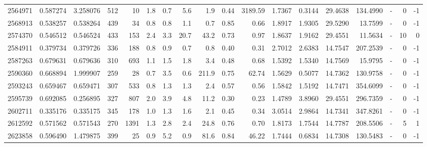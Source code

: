 \begin{tabular}{rrrrrrrrrrrrrrrlrr}
   2564971 & 0.587274 &   3.258076 &  512 &   10 &      1.8 &      0.7 &     5.6 &      1.9 &       0.44 &     3189.59 &  1.7367 &  0.3144 &   29.4638 &  134.4990 &             - &        0 &         -1 \\
   2568913 & 0.538257 &   0.538264 &  439 &   34 &      0.8 &      0.8 &     1.1 &      0.7 &       0.85 &        0.66 &  1.8917 &  1.9305 &   29.5290 &   13.7599 &             - &        0 &         -1 \\
   2574370 & 0.546512 &   0.546524 &  433 &  153 &      2.4 &      3.3 &    20.7 &     43.2 &       0.73 &        0.97 &  1.8637 &  1.9162 &   29.4551 &   11.5634 &             - &       10 &          0 \\
   2584911 & 0.379734 &   0.379726 &  336 &  188 &      0.8 &      0.9 &     0.7 &      0.8 &       0.40 &        0.31 &  2.7012 &  2.6383 &   14.7547 &  207.2539 &             - &        0 &         -1 \\
   2587263 & 0.679631 &   0.679636 &  310 &  693 &      1.1 &      1.5 &     1.8 &      3.4 &       0.48 &        0.68 &  1.5392 &  1.5340 &   14.7569 &   15.9795 &             - &        0 &         -1 \\
   2590360 & 0.668894 &   1.999907 &  259 &   28 &      0.7 &      3.5 &     0.6 &    211.9 &       0.75 &       62.74 &  1.5629 &  0.5077 &   14.7362 &  130.9758 &             - &        0 &         -1 \\
   2593243 & 0.659467 &   0.659471 &  307 &  533 &      0.8 &      1.3 &     1.3 &      2.4 &       0.57 &        0.56 &  1.5842 &  1.5192 &   14.7471 &  354.6099 &             - &        0 &         -1 \\
   2595739 & 0.692085 &   0.256895 &  327 &  807 &      2.0 &      3.9 &     4.8 &     11.2 &       0.30 &        0.23 &  1.4789 &  3.8960 &   29.4551 &  296.7359 &             - &        0 &         -1 \\
   2602711 & 0.335176 &   0.335175 &  345 &  178 &      1.0 &      1.3 &     1.6 &      2.1 &       0.45 &        0.34 &  3.0514 &  2.9864 &   14.7341 &  347.8261 &             - &        0 &         -1 \\
   2612592 & 0.571562 &   0.571543 &  270 & 1391 &      1.3 &      2.8 &     2.4 &     24.8 &       0.76 &        0.70 &  1.8173 &  1.7544 &   14.7787 &  208.5506 &             - &        5 &          1 \\
   2623858 & 0.596490 &   1.479875 &  399 &   25 &      0.9 &      5.2 &     0.9 &     81.6 &       0.84 &       46.22 &  1.7444 &  0.6834 &   14.7308 &  130.5483 &             - &        0 &         -1 \\

\end{tabular}
